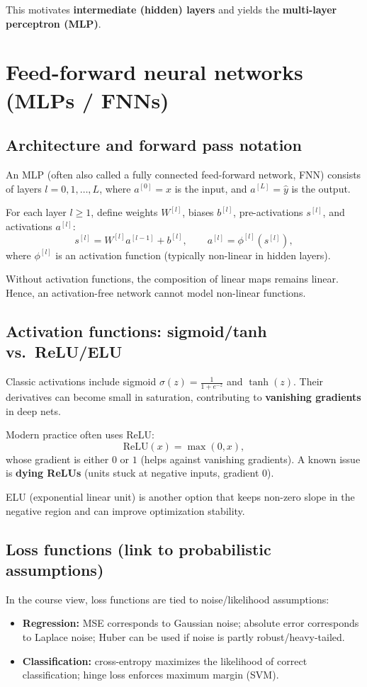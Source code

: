 \documentclass[11pt, oneside]{book}
\newcommand{\1}{\ind}                       %
\newcommand{\sigmoid}{\sigma}               %
\begin{document}
This motivates \textbf{intermediate (hidden) layers} and yields the \textbf{multi-layer perceptron (MLP)}.

\section{Feed-forward neural networks (MLPs / FNNs)}
\subsection{Architecture and forward pass notation}
An MLP (often also called a fully connected feed-forward network, FNN) consists of layers $l=0,1,\dots,L$, where $a^{[0]}=x$ is the input, and $a^{[L]}=\hat y$ is the output.

For each layer $l\ge 1$, define weights $W^{[l]}$, biases $b^{[l]}$, pre-activations $s^{[l]}$, and activations $a^{[l]}$:
\[
s^{[l]} = W^{[l]}a^{[l-1]} + b^{[l]},
\qquad
a^{[l]} = \phi^{[l]}(s^{[l]}),
\]
where $\phi^{[l]}$ is an activation function (typically non-linear in hidden layers).

\begin{intbox}
Without activation functions, the composition of linear maps remains linear. Hence, an activation-free network cannot model non-linear functions.
\end{intbox}

\subsection{Activation functions: sigmoid/tanh vs.\ ReLU/ELU}
Classic activations include sigmoid $\sigmoid(z)=\frac{1}{1+e^{-z}}$ and $\tanh(z)$. Their derivatives can become small in saturation, contributing to \textbf{vanishing gradients} in deep nets.

Modern practice often uses ReLU:
\[
\mathrm{ReLU}(x)=\max(0,x),
\]
whose gradient is either $0$ or $1$ (helps against vanishing gradients). A known issue is \textbf{dying ReLUs} (units stuck at negative inputs, gradient $0$).

ELU (exponential linear unit) is another option that keeps non-zero slope in the negative region and can improve optimization stability.

\subsection{Loss functions (link to probabilistic assumptions)}
In the course view, loss functions are tied to noise/likelihood assumptions:
\begin{itemize}
  \item \textbf{Regression:} MSE corresponds to Gaussian noise; absolute error corresponds to Laplace noise; Huber can be used if noise is partly robust/heavy-tailed.
  \item \textbf{Classification:} cross-entropy maximizes the likelihood of correct classification; hinge loss enforces maximum margin (SVM).
\end{itemize}
\end{document}

